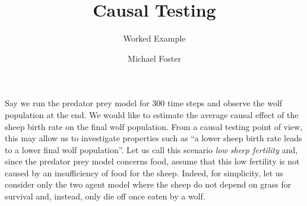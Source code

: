 \documentclass{article}
\title{Causal Testing}
\subtitle{Worked Example}
\author{Michael Foster}
\begin{document}
\maketitle

Say we run the predator prey model for 300 time steps and observe the wolf population at the end. We would like to estimate the average causal effect of the sheep birth rate on the final wolf population. From a causal testing point of view, this may allow us to investigate properties such as ``a lower sheep birth rate leads to a lower final wolf population''. Let us call this scenario \emph{low sheep fertility} and, since the predator prey model concerns food, assume that this low fertility is not caused by an insufficiency of food for the sheep. Indeed, for simplicity, let us consider only the two agent model where the sheep do not depend on grass for survival and, instead, only die off once eaten by a wolf.
\end{document}
